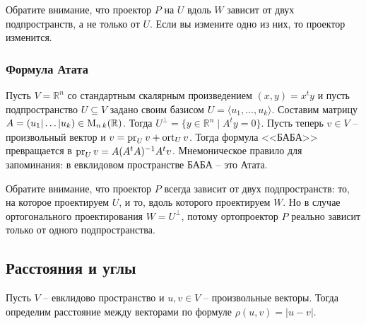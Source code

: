 Обратите внимание, что проектор $P$ на $U$ вдоль $W$ зависит от двух подпространств, а не только от $U$.
Если вы измените одно из них, то проектор изменится.

\subsubsection*{Формула Атата}

Пусть $V = \mathbb R^n$ со стандартным скалярным произведением $(x, y) = x^ty$ и пусть подпространство $U\subseteq V$ задано своим базисом $U = \langle u_1,\ldots,u_k\rangle$.
Составим матрицу $A = (u_1|\ldots|u_k)\in\operatorname{M}_{n\,k}(\mathbb R)$.
Тогда $U^\bot = \{y\in \mathbb R^n \mid A^t y = 0\}$.
Пусть теперь $v\in V$ -- произвольный вектор и $v = \operatorname{pr}_U v + \operatorname{ort}_U v$.
Тогда формула <<БАБА>> превращается в $\operatorname{pr}_U v = A(A^tA)^{-1}A^tv$.
Мнемоническое правило для запоминания: в евклидовом пространстве БАБА -- это Атата.

Обратите внимание, что проектор $P$ всегда зависит от двух подпространств: то, на которое проектируем $U$, и то, вдоль которого проектируем $W$.
Но в случае ортогонального проектирования $W = U^\bot$, потому ортопроектор $P$ реально зависит только от одного подпространства.

\subsection{Расстояния и углы}

\begin{definition}
Пусть $V$ -- евклидово пространство и $u,v\in V$ -- произвольные векторы.
Тогда определим расстояние между векторами по формуле $\rho(u,v) = |u - v|$.
\end{definition}

